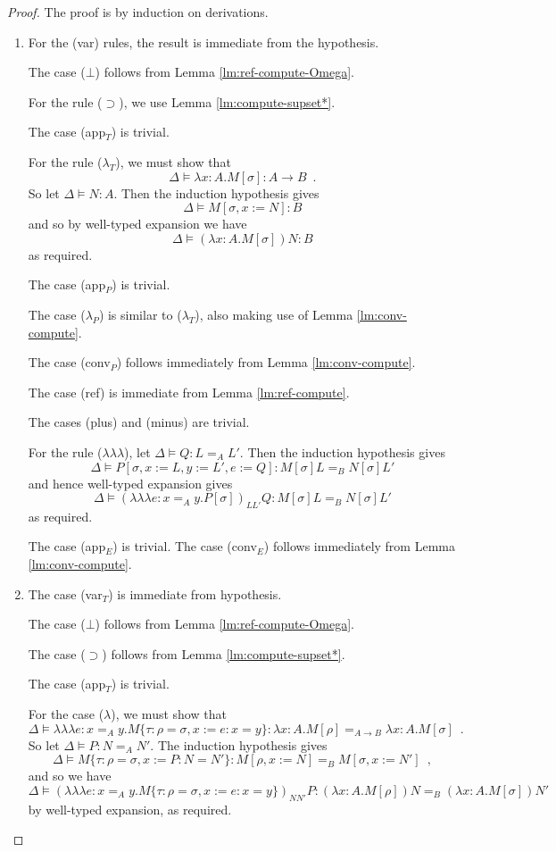 \documentclass[a4paper,UKenglish]{lipics-v2016}
\newcommand*{\triplelambda}{\ensuremath{\lambda \!\! \lambda \!\! \lambda}}
\theoremstyle{plain}
\begin{document}
\begin{proof}
The proof is by induction on derivations.
\begin{enumerate}
\item
For the (var) rules, the result is immediate from the hypothesis.  

The case ($\bot$) follows from Lemma \ref{lm:ref-compute-Omega}.

For the rule ($\supset$), we use Lemma \ref{lm:compute-supset*}.

The case (app$_T$) is trivial.

For the rule ($\lambda_T$), we must show that
\[ \Delta \models \lambda x:A.M[\sigma] : A \rightarrow B \enspace . \]
So let $\Delta \models N : A$.  Then the induction hypothesis gives
\[ \Delta \models M[\sigma, x:=N] : B \]
and so by well-typed expansion we have
\[ \Delta \models (\lambda x:A.M[\sigma])N : B \]
as required.

The case (app$_P$) is trivial.

The case ($\lambda_P$) is similar to ($\lambda_T$), also making use of Lemma \ref{lm:conv-compute}.

The case (conv$_P$) follows immediately from Lemma \ref{lm:conv-compute}.

The case (ref) is immediate from Lemma \ref{lm:ref-compute}.

The cases (plus) and (minus) are trivial.

For the rule ($\triplelambda$), let $\Delta \models Q : L =_A L'$.  Then the induction hypothesis gives
\[ \Delta \models P [ \sigma, x := L, y := L', e := Q ] : M [\sigma] L =_B N [\sigma] L' \]
and hence well-typed expansion gives
\[ \Delta \models (\triplelambda e:x =_A y.P [ \sigma ])_{L L'} Q : M[\sigma] L =_B N[\sigma] L' \]
as required.

The case (app$_E$) is trivial.  The case (conv$_E$) follows immediately from Lemma \ref{lm:conv-compute}.
\item
The case (var$_T$) is immediate from hypothesis.

The case ($\bot$) follows from Lemma \ref{lm:ref-compute-Omega}.

The case ($\supset$) follows from Lemma \ref{lm:compute-supset*}.

The case (app$_T$) is trivial.

For the case ($\lambda$), we must show that
\[ \Delta \models \triplelambda e : x =_A y. M \{ \tau : \rho = \sigma, x := e : x = y \} : \lambda x:A.M [ \rho ] =_{A \rightarrow B} \lambda x:A.M [ \sigma ] \enspace . \]
So let $\Delta \models P : N =_A N'$.  The induction hypothesis gives
\[ \Delta \models M \{ \tau : \rho = \sigma, x := P : N = N' \} : M [\rho, x := N] =_B M [\sigma, x := N'] \enspace , \]
and so we have
\[ \Delta \models (\triplelambda e : x =_A y. M \{ \tau : \rho = \sigma, x := e : x = y \})_{N N'} P : (\lambda x:A.M [ \rho ])N =_B (\lambda x:A.M [ \sigma ])N'\]
by well-typed expansion, as required.
\end{enumerate}
\end{proof}
\end{document}
